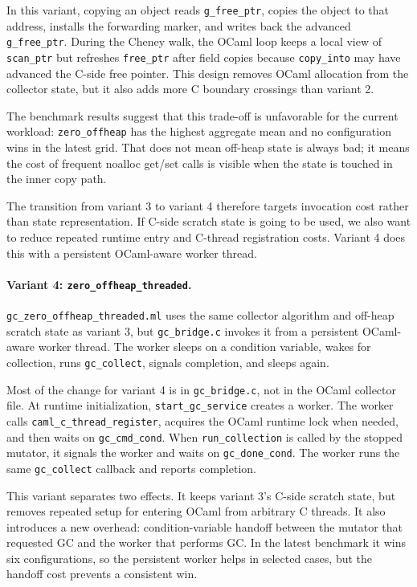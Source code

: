 \documentclass[11pt,a4paper]{article}
\begin{document}
In this variant, copying an object reads \texttt{g\_free\_ptr}, copies the
object to that address, installs the forwarding marker, and writes back the
advanced \texttt{g\_free\_ptr}.  During the Cheney walk, the OCaml loop keeps a
local view of \texttt{scan\_ptr} but refreshes \texttt{free\_ptr} after field
copies because \texttt{copy\_into} may have advanced the C-side free pointer.
This design removes OCaml allocation from the collector state, but it also
adds more C boundary crossings than variant 2.

The benchmark results suggest that this trade-off is unfavorable for the
current workload: \texttt{zero\_offheap} has the highest aggregate mean and no
configuration wins in the latest grid.  That does not mean off-heap state is
always bad; it means the cost of frequent noalloc get/set calls is visible when
the state is touched in the inner copy path.

The transition from variant 3 to variant 4 therefore targets invocation cost
rather than state representation.  If C-side scratch state is going to be used,
we also want to reduce repeated runtime entry and C-thread registration costs.
Variant 4 does this with a persistent OCaml-aware worker thread.

\paragraph{Variant 4: \texttt{zero\_offheap\_threaded}.}
\texttt{gc\_zero\_offheap\_threaded.ml} uses the same collector algorithm and
off-heap scratch state as variant 3, but \texttt{gc\_bridge.c} invokes it from a
persistent OCaml-aware worker thread.  The worker sleeps on a condition
variable, wakes for collection, runs \texttt{gc\_collect}, signals completion,
and sleeps again.

Most of the change for variant 4 is in \texttt{gc\_bridge.c}, not in the OCaml
collector file.  At runtime initialization, \texttt{start\_gc\_service} creates
a worker.  The worker calls \texttt{caml\_c\_thread\_register}, acquires the
OCaml runtime lock when needed, and then waits on \texttt{gc\_cmd\_cond}.  When
\texttt{run\_collection} is called by the stopped mutator, it signals the
worker and waits on \texttt{gc\_done\_cond}.  The worker runs the same
\texttt{gc\_collect} callback and reports completion.

This variant separates two effects.  It keeps variant 3's C-side scratch state,
but removes repeated setup for entering OCaml from arbitrary C threads.  It
also introduces a new overhead: condition-variable handoff between the mutator
that requested GC and the worker that performs GC.  In the latest benchmark it
wins six configurations, so the persistent worker helps in selected cases, but
the handoff cost prevents a consistent win.
\end{document}
